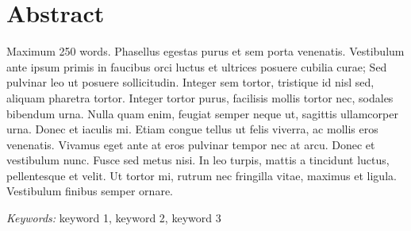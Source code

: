 \relax
{}\relax

\section*{Abstract}



\noindent Maximum 250 words. Phasellus egestas purus et sem porta venenatis. Vestibulum ante ipsum primis in faucibus orci luctus et ultrices posuere cubilia curae; Sed pulvinar leo ut posuere sollicitudin. Integer sem tortor, tristique id nisl sed, aliquam pharetra tortor. Integer tortor purus, facilisis mollis tortor nec, sodales bibendum urna. Nulla quam enim, feugiat semper neque ut, sagittis ullamcorper urna. Donec et iaculis mi. Etiam congue tellus ut felis viverra, ac mollis eros venenatis. Vivamus eget ante at eros pulvinar tempor nec at arcu. Donec et vestibulum nunc. Fusce sed metus nisi. In leo turpis, mattis a tincidunt luctus, pellentesque et velit. Ut tortor mi, rutrum nec fringilla vitae, maximus et ligula. Vestibulum finibus semper ornare. 


\textit{Keywords:} keyword 1, keyword 2, keyword 3

\bigskip

\relax
{}\relax
\raggedright
\setlength\parindent{0.5in}